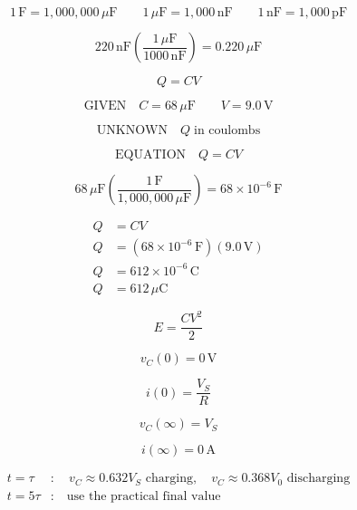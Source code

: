 \documentclass{article}
\begin{document}
\color{SlideNavy}

\begin{preview}\[1\,\mathrm{F}=1{,}000{,}000\,\mu\mathrm{F}\qquad 1\,\mu\mathrm{F}=1{,}000\,\mathrm{nF}\qquad 1\,\mathrm{nF}=1{,}000\,\mathrm{pF}\]\end{preview}
\begin{preview}\[220\,\mathrm{nF}\left(\frac{1\,\mu\mathrm{F}}{1000\,\mathrm{nF}}\right)=0.220\,\mu\mathrm{F}\]\end{preview}
\begin{preview}\[Q=CV\]\end{preview}
\begin{preview}\[\text{GIVEN}\quad C=68\,\mu\mathrm{F}\qquad V=9.0\,\mathrm{V}\]\end{preview}
\begin{preview}\[\text{UNKNOWN}\quad Q\;\text{in coulombs}\]\end{preview}
\begin{preview}\[\text{EQUATION}\quad Q=CV\]\end{preview}
\begin{preview}\[68\,\mu\mathrm{F}\left(\frac{1\,\mathrm{F}}{1{,}000{,}000\,\mu\mathrm{F}}\right)=68\times10^{-6}\,\mathrm{F}\]\end{preview}
\begin{preview}\[\begin{aligned}Q&=CV\\Q&=(68\times10^{-6}\,\mathrm{F})(9.0\,\mathrm{V})\\Q&=612\times10^{-6}\,\mathrm{C}\\Q&=612\,\mu\mathrm{C}\end{aligned}\]\end{preview}
\begin{preview}\[E=\frac{CV^2}{2}\]\end{preview}
\begin{preview}\[v_C(0)=0\,\mathrm{V}\]\end{preview}
\begin{preview}\[i(0)=\frac{V_S}{R}\]\end{preview}
\begin{preview}\[v_C(\infty)=V_S\]\end{preview}
\begin{preview}\[i(\infty)=0\,\mathrm{A}\]\end{preview}
\begin{preview}\[\begin{aligned}t=\tau &: \quad v_C\approx0.632V_S\text{ charging},\quad v_C\approx0.368V_0\text{ discharging}\\t=5\tau &: \quad \text{use the practical final value}\end{aligned}\]\end{preview}
\end{document}

